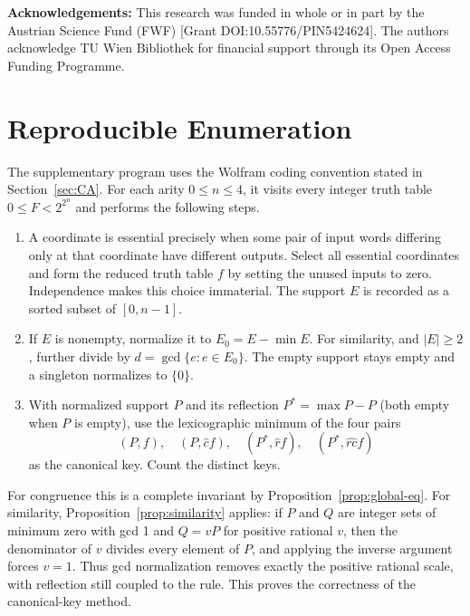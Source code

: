 \documentclass[11pt,a4paper]{article}
\newenvironment{revision}{\color{blue}}{}
\newenvironment{revision}{\color{black}}{}
\newcommand{\locmark}[1]{\label{#1}\linelabel{line:#1}}
\begin{document}
\textbf{Acknowledgements:}
This research was funded in whole or in part by the Austrian Science Fund (FWF) [Grant DOI:10.55776/PIN5424624]. The authors acknowledge TU Wien Bibliothek for financial support through its Open Access Funding Programme.


\begin{revision}
\appendix
\section{Reproducible Enumeration}
\label{app:verification}\locmark{loc:verification}
The supplementary program uses the Wolfram coding convention stated in
Section~\ref{sec:CA}. For each arity $0\leq n\leq4$, it visits every
integer truth table $0\leq F<2^{2^n}$ and performs the following steps.
\begin{enumerate}
\item A coordinate is essential precisely when some pair of input words
differing only at that coordinate have different outputs. Select all
essential coordinates and form the reduced truth table $f$ by setting
the unused inputs to zero. Independence makes this choice immaterial.
The support $E$ is recorded as a sorted subset of $[0,n-1]$.
\item If $E$ is nonempty, normalize it to $E_0=E-\min E$.
For similarity, and $|E|\geq2$, further divide by
$d=\gcd\{e:e\in E_0\}$.
The empty support stays empty and a singleton normalizes to $\{0\}$.
\item With normalized support $P$ and its reflection
$P^*=\max P-P$ (both empty when $P$ is empty), use the lexicographic
minimum of the four pairs
\[
(P,f),\quad(P,\hat cf),\quad(P^*,\hat rf),\quad(P^*,\widehat{rc}f)
\]
as the canonical key. Count the distinct keys.
\end{enumerate}
For congruence this is a complete invariant by
Proposition~\ref{prop:global-eq}. For similarity,
Proposition~\ref{prop:similarity} applies: if $P$ and $Q$ are integer
sets of minimum zero with gcd 1 and $Q=vP$ for positive rational $v$,
then the denominator of $v$ divides every element of $P$, and applying
the inverse argument forces $v=1$. Thus gcd normalization removes
exactly the positive rational scale, with reflection still coupled to
the rule. This proves the correctness of the canonical-key method.


\end{revision}
\end{document}
